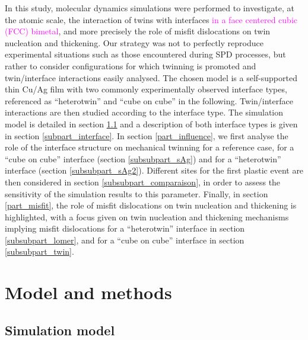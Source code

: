 \documentclass[final,3p,times,twocolumn]{elsarticle}
\begin{document}
In this study, molecular dynamics simulations were performed to investigate, at the atomic scale, the interaction of twins with interfaces \textcolor{magenta}{in a face centered cubic (FCC) bimetal}, and more precisely the role of misfit dislocations on twin nucleation and thickening. 
Our strategy was not to perfectly reproduce experimental situations such as those encountered during SPD processes,
but rather to consider configurations for which twinning is promoted and twin/interface interactions easily analysed. The chosen model is a self-supported thin Cu/Ag film with two commonly experimentally observed interface types, referenced as “heterotwin” and “cube on cube” in the following. Twin/interface interactions are then studied according to the interface type. The simulation model is detailed in section \ref{subpart_model} and a description of both interface types is given in section \ref{subpart_interface}. In section \ref{part_influence}, we first analyse the role of the interface structure on mechanical twinning for a reference case, for a “cube on cube” interface (section \ref{subsubpart_sAg}) and for a “heterotwin” interface (section \ref{subsubpart_sAg2}). Different sites for the first plastic event are then considered in section \ref{subsubpart_comparaison}, in order to assess the sensitivity of the simulation results to this parameter. Finally, in section \ref{part_misfit}, the role of misfit dislocations on twin nucleation and thickening is highlighted, with a focus given on twin nucleation and thickening mechanisms implying misfit dislocations for a “heterotwin” interface in section \ref{subsubpart_lomer}, and for a “cube on cube” interface in section \ref{subsubpart_twin}.         

\section{Model and methods}
\label{part_methods}

	\subsection{Simulation model}
	\label{subpart_model}
	
\end{document}
